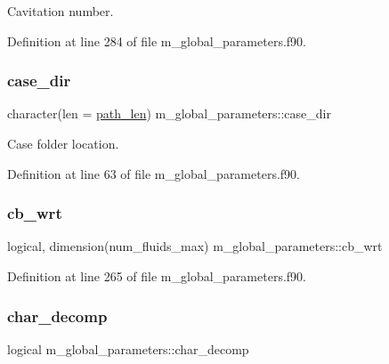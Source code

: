 Cavitation number. 



Definition at line 284 of file m\+\_\+global\+\_\+parameters.\+f90.

\mbox{\label{namespacem__global__parameters_a0b91e533fe3b3e112c42af4024014544}} 
\subsubsection{\texorpdfstring{case\+\_\+dir}{case\_dir}}
{\footnotesize\ttfamily character(len = \hyperlink{namespacem__global__parameters_aa9d578c318044b2f2ec990b5fc0dfab9}{path\+\_\+len}) m\+\_\+global\+\_\+parameters\+::case\+\_\+dir}



Case folder location. 



Definition at line 63 of file m\+\_\+global\+\_\+parameters.\+f90.

\mbox{\label{namespacem__global__parameters_a2ed9e718df8c2a250e5d8cce2e04cbb7}} 
\subsubsection{\texorpdfstring{cb\+\_\+wrt}{cb\_wrt}}
{\footnotesize\ttfamily logical, dimension(num\+\_\+fluids\+\_\+max) m\+\_\+global\+\_\+parameters\+::cb\+\_\+wrt}



Definition at line 265 of file m\+\_\+global\+\_\+parameters.\+f90.

\mbox{\label{namespacem__global__parameters_ab62b8c589dcddff0e6295f4956012c7a}} 
\subsubsection{\texorpdfstring{char\+\_\+decomp}{char\_decomp}}
{\footnotesize\ttfamily logical m\+\_\+global\+\_\+parameters\+::char\+\_\+decomp}



